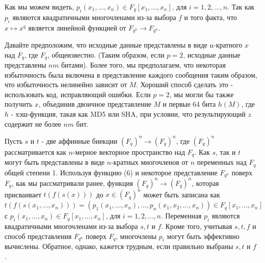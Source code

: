 Как мы можем видеть, $p_i(x_1,\ldots,x_n) \in F_q[x_1,\ldots,x_n]$, для $i=1,2,\ldots,n$. Так как $p_i$ являются квадратичными многочленами из-за выбора $f$ и того факта, что $x \longmapsto x^q$ является линейной функцией от $F_{q^n} \rightarrow F_{q^n}$.

Давайте предположим, что исходные данные представлены в виде n-кратного $x$ над $F_q$, где $F_q$, общеизвестно.  (Таким образом, если $p = 2$, исходные данные представлены $nm$ битами). Более того, мы предполагаем, что некоторая избыточность была включена в представление каждого сообщения таким образом, что избыточность нелинейно зависит от $M$. Хороший способ сделать это - использовать код, исправляющий ошибки. Если $p = 2$, мы могли бы также получить $x$, объединив двоичное представление $M$ и первые 64 бита $h(M)$, где $h$ - хэш-функция, такая как MD5 или SHA, при условии, что результирующий $z$ содержит не более $nm$ бит.

Пусть $s$ и $t$ - две аффинные биекции $(F_q)^n \rightarrow (F_q)^n$, где $(F_q)^n$ рассматривается как $n$-мерное векторное пространство над $F_q$. Как $s$, так и $t$ могут быть представлены в виде $n$-кратных многочленов от $n$ переменных над $F_q$ общей степени 1. Используя функцию (6) и некоторое представление $F_{q^n}$ поверх $F_q$, как мы рассматривали ранее, функция $(F_q)^n \rightarrow (F_q)^n$, которая присваивает $t(f(s(x)))$ до $x \in (F_q)^n$ может быть записана как
\begin{equation}
    t(f(s(x_1,\ldots,x_n))) = (p_1(x_1,\ldots,x_n),\ldots,p_n(x_1,x_2,\ldots,x_n)) \in F_q [x_1,\ldots,x_n]
\end{equation}
с $p_i(x_1,\ldots,x_n) \in F_q[x_1,\ldots,x_n]$, для $i=1,2,\ldots,n$. Переменная $p_i$ являются квадратичными многочленами из-за выбора $s, t$ и $f$. Кроме того, учитывая $s, t, f$ и способ представления $F_{q^n}$ поверх $F_q$, многочлены $p_i$ могут быть эффективно вычислены. Обратное, однако, кажется трудным, если правильно выбраны $s, t$ и $f$. 

